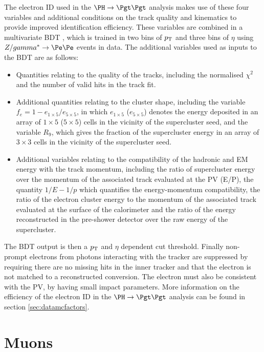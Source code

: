 The electron ID used in the $\PH \to \Pgt\Pgt$ analysis makes use of these four variables and additional
conditions on the track quality and kinematics \cite{Baffioni:2006cd} to provide
improved identification efficiency. These variables are combined in a
multivariate \ac{BDT} \cite{TMVA}, which is trained in two bins of
$p_{\mathrm{T}}$ and three bins of $\eta$ using $Z/\gamma^{*} \to \Pe\Pe$ events in data.
The additional variables used as inputs to the \ac{BDT} are as follows:

\begin{itemize}
\item Quantities relating to the quality of the tracks, including the normalised
$\chi^{2}$ and the number of valid hits in the track fit.
\item Additional quantities relating to the cluster shape, including the
variable $f_{e}=1-e_{1\times5}/e_{5\times5}$, in which $e_{1\times5}$
($e_{5\times5}$) denotes the energy deposited in an array of $1 \times 5$ ($5
\times 5$) cells in the vicinity of the supercluster seed, and the variable
$R_{9}$, which gives the fraction of the supercluster energy in an array of
$3\times3$ cells in the vicinity of the supercluster seed.  
\item Additional variables relating to the compatibility of the hadronic and EM
energy with the track momentum, including the ratio of supercluster energy over
the momentum of the associated track evaluated at the \ac{PV} (E/P), the
quantity $1/E-1/p$ which quantifies the energy-momentum compatibility, the ratio
of the electron cluster energy to the momentum of the associated track evaluated
at the surface of the calorimeter and the ratio of the energy reconstructed in
the pre-shower detector over the raw energy of the supercluster.  
\end{itemize}

The \ac{BDT} output is then a $p_{\mathrm{T}}$ and $\eta$ dependent cut threshold. Finally
non-prompt electrons from photons interacting with the tracker are suppressed
by requiring there are no missing hits in the inner tracker and that the
electron is not matched to a reconstructed conversion. The electron must also be
consistent with the \ac{PV}, by having small impact parameters. More information
on the efficiency of the electron ID in the $\PH \to \Pgt\Pgt$ analysis can be
found in section \ref{sec:datamcfactors}.

\section{Muons}
\label{sec:muons}

